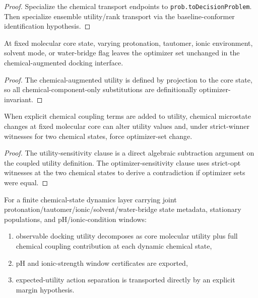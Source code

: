 \begin{proof}
Specialize the chemical transport endpoints to \texttt{prob.toDecisionProblem}. Then specialize ensemble utility/rank transport via the baseline-conformer identification hypothesis.
\end{proof}

\begin{theorem}\label{thm:chemical-component-variation-opt-invariance}
At fixed molecular core state, varying protonation, tautomer, ionic environment, solvent mode, or water-bridge flag leaves the optimizer set unchanged in the chemical-augmented docking interface.
\end{theorem}

\begin{proof}
The chemical-augmented utility is defined by projection to the core state, so all chemical-component-only substitutions are definitionally optimizer-invariant.
\end{proof}

\begin{theorem}\label{thm:chemical-coupled-sensitivity}
When explicit chemical coupling terms are added to utility, chemical microstate changes at fixed molecular core can alter utility values and, under strict-winner witnesses for two chemical states, force optimizer-set change.
\end{theorem}

\begin{proof}
The utility-sensitivity clause is a direct algebraic subtraction argument on the coupled utility definition. The optimizer-sensitivity clause uses strict-opt witnesses at the two chemical states to derive a contradiction if optimizer sets were equal.
\end{proof}

\begin{theorem}\label{thm:unified-chemical-state-dynamics-transport}
For a finite chemical-state dynamics layer carrying joint protonation/tautomer/ionic/solvent/water-bridge state metadata, stationary populations, and pH/ionic-condition windows:
\begin{enumerate}
\item observable docking utility decomposes as core molecular utility plus full chemical coupling contribution at each dynamic chemical state,
\item pH and ionic-strength window certificates are exported,
\item expected-utility action separation is transported directly by an explicit margin hypothesis.
\end{enumerate}
\end{theorem}

